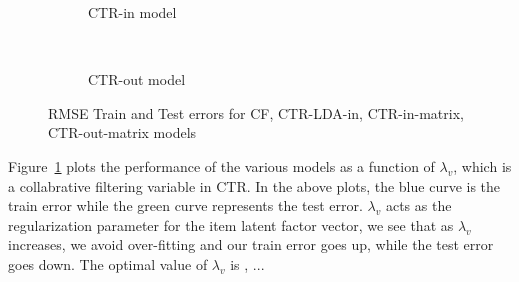 \documentclass{article} %
\begin{document}
\begin{figure}[h]
\begin{subfigure}[b]{0.49\textwidth}
	\caption{CTR-in model}
	\end{subfigure}
	~	
	\begin{subfigure}[b]{0.49\textwidth}
	\caption{CTR-out model}
	\end{subfigure}
\caption{RMSE Train and Test errors for CF, CTR-LDA-in, CTR-in-matrix, CTR-out-matrix models}
\label{fig:models}
\end{figure}

Figure~\ref{fig:models} plots the performance of the various models as a function of $\lambda_{v}$, which is a collabrative filtering variable in CTR. In the 
above plots, the blue curve is the train error while the green curve represents
the test error. $\lambda_{v}$ acts as the regularization parameter for the item
latent factor vector, we see that as $\lambda_{v}$ increases, we avoid over-fitting and our train error goes up, while the test error goes down. The optimal 
value of $\lambda_{v}$ is , ...
\end{document}
